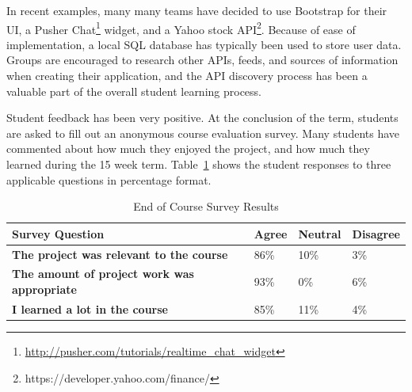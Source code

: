 \documentclass[conference]{IEEEtran}
\begin{document}
In recent examples, many many teams have decided to use Bootstrap for their UI, a Pusher Chat\footnote{\url{http://pusher.com/tutorials/realtime_chat_widget}} widget, and a Yahoo stock API\footnote{https://developer.yahoo.com/finance/}.  Because of ease of implementation, a local SQL database has typically been used to store user data. Groups are encouraged to research other APIs, feeds, and sources of information when creating their application, and the API discovery process has been a valuable part of the overall student learning process.

Student feedback has been very positive. At the conclusion of the term, students are asked to fill out an anonymous course evaluation survey. Many students have commented about how much they enjoyed the project, and how much they learned during the 15 week term. Table~\ref{table:surveyresults} shows the student responses to three applicable questions in percentage format.


\begin{table}[h]
  \caption{End of Course Survey Results}
     \begin{tabular}{ p{4.1cm} | p{0.95cm} | p{0.95cm} | p{0.95cm} }
	\bfseries Survey Question & \bfseries Agree & \bfseries Neutral & \bfseries Disagree \\ \hline \hline
	\bfseries The project was relevant to the course & 86\% & 10\% & 3\% \\ \hline
	\bfseries The amount of project work was appropriate & 93\% & 0\% & 6\% \\ \hline
	\bfseries I learned a lot in the course & 85\% & 11\% & 4\%\\

  \end{tabular}
  \label{table:surveyresults}

\end{table}

\end{document}
